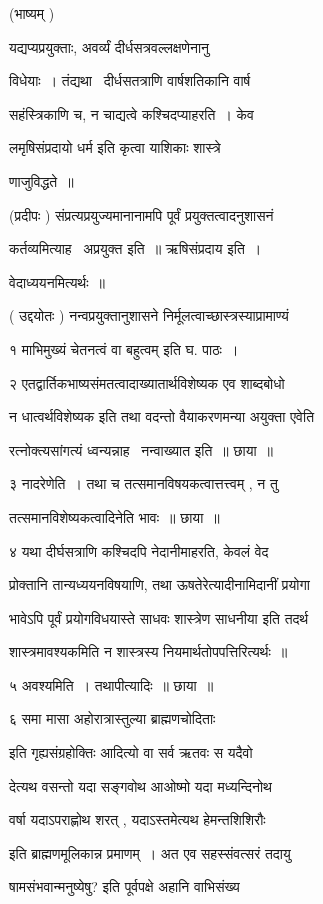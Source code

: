 \documentclass[11pt, openany]{book}
\begin{document}
(भाष्यम् ) 

यद्यप्यप्रयुक्ताः, अवर्व्यं दीर्धसत्रवल्लक्षणेनानु \textendash\ 

विधेयाः~। तंद्यथा \textendash\ दीर्धसतत्राणि वार्षशतिकानि वार्ष \textendash\ 

सहंस्त्रिकाणि च, न चाद्यत्वे कश्चिदप्याहरति~। केव \textendash\ 

लमृषिसंप्रदायो धर्म इति कृत्वा याशिकाः शास्त्रे \textendash\ 

णाजुविद्धते~॥ 

(प्रदीपः ) संप्रत्यप्रयुज्यमानानामपि पूर्वं प्रयुक्तत्वादनुशासनं 

कर्तव्यमित्याह \textendash\ अप्रयुक्त इति~॥ ऋषिसंप्रदाय इति~। 

वेदाध्ययनमित्यर्थः~॥ 

( उद्दयोतः ) नन्वप्रयुक्तानुशासने निर्मूलत्वाच्छास्त्रस्याप्रामाण्यं 



१ {\qt माभिमुख्यं चेतनत्वं वा बहुत्वम्} इति घ. पाठः~। 

२ एतद्वार्तिकभाष्यसंमतत्वादाख्यातार्थविशेष्यक एव शाब्दबोधो 

न धात्वर्थविशेष्यक इति तथा वदन्तो वैयाकरणमन्या अयुक्ता एवेति 

रत्नोक्त्यसांगत्यं ध्वन्यन्नाह \textendash\ नन्वाख्यात इति~॥ छाया~॥ 

३ नादरेणेति~। तथा च तत्समानविषयकत्वात्तत्त्वम् , न तु 

तत्समानविशेष्यकत्वादिनेति भावः~॥ छाया~॥ 

४ यथा दीर्घसत्राणि कश्चिदपि नेदानीमाहरति, केवलं वेद \textendash\ 

प्रोक्तानि तान्यध्ययनविषयाणि, तथा ऊषतेरेत्यादीनामिदानीं प्रयोगा \textendash\ 

भावेऽपि पूर्वं प्रयोगविधयास्ते साधवः शास्त्रेण साधनीया इति तदर्थ 

शास्त्रमावश्यकमिति न शास्त्रस्य नियमार्थतोपपत्तिरित्यर्थः~॥ 

५ अवश्यमिति~। तथापीत्यादिः~॥ छाया~॥ 

६ {\qt समा मासा अहोरात्रास्तुल्या ब्राह्मणचोदिताः} 

इति गृह्यसंग्रहोक्तिः आदित्यो वा सर्व ऋतवः स यदैवो \textendash\ 

देत्यथ वसन्तो यदा सङ्गवोथ आओष्मो यदा मध्यन्दिनोथ 

वर्षा यदाऽपराह्णोथ शरत् , यदाऽस्तमेत्यथ हेमन्तशिशिरौः 

इति ब्राह्मणमूलिकान्न प्रमाणम्~। अत एव सहस्संवत्सरं तदायु \textendash\ 

षामसंभवान्मनुष्येषु? इति पूर्वपक्षे {\qt अहानि वाभिसंख्य} \textendash\ 
\end{document}
